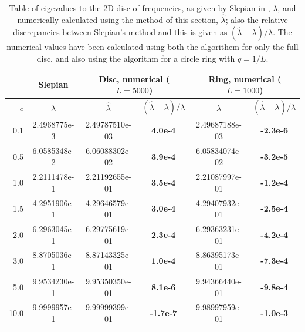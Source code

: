 \documentclass[11pt,a4paper, 
swedish,english %
]{article}
\begin{document}
\begin{table}

\centering
\caption{Table of eigevalues to the 2D disc of frequencies, as given
  by Slepian in \cite{PSWF-IV_1964}, $\lambda$, and numerically
  calculated using the method of this section, $\hat\lambda$; also the
  relative discrepancies between Slepian's method and this is given as
  $(\hat\lambda-\lambda)/\lambda$. The numerical values have been
  calculated using both the algorithem for only the full disc, and
  also using the algorithm for a circle ring with $q=1/L$.
}
\label{tab:just}
\begin{tabular}{|r|c|c|c|c|c|}\cline{2-6}
\multicolumn{1}{c|}{}
&Slepian\cite{PSWF-IV_1964}&
\multicolumn{2}{|c|}{Disc, numerical ($L=5000$)}&
\multicolumn{2}{|c|}{Ring, numerical ($L=1000$)}
\\ \hline
$c$\phantom{1.}&$\lambda$
&$\hat\lambda$&$(\hat\lambda-\lambda)/\lambda$
&$\hat\lambda$&$(\hat\lambda-\lambda)/\lambda$
\\ \hline
  0.1 & 2.4968775e-3 & 
2.49787510e-03 &\bf\phantom{-}4.0e-4&  
2.49687188e-03 &\bf-2.3e-6
\\ \hline
  0.5 & 6.0585348e-2 & 
6.06088302e-02 &\bf\phantom{-}3.9e-4&  
6.05834074e-02 &\bf-3.2e-5
\\ \hline
  1.0 & 2.2111478e-1 & 
2.21192655e-01 &\bf\phantom{-}3.5e-4&  
2.21087997e-01 &\bf-1.2e-4
\\ \hline
  1.5 & 4.2951906e-1 & 
4.29646579e-01 &\bf\phantom{-}3.0e-4&  
4.29407932e-01 &\bf-2.5e-4
\\ \hline
  2.0 & 6.2963045e-1 & 
6.29775619e-01 &\bf\phantom{-}2.3e-4&  
6.29363231e-01 &\bf-4.2e-4
\\ \hline
  3.0 & 8.8705036e-1 & 
8.87143325e-01 &\bf\phantom{-}1.0e-4&  
8.86395173e-01 &\bf-7.3e-4
\\ \hline
  5.0 & 9.9534230e-1 & 
9.95350350e-01 &\bf\phantom{-}8.1e-6&  
9.94366440e-01 &\bf-9.8e-4
\\ \hline
 10.0 & 9.9999957e-1 & 
9.99999399e-01 &\bf\phantom{}-1.7e-7&  
9.98997959e-01 &\bf-1.0e-3
\\ \hline
\end{tabular}
\end{table}


\end{document}
